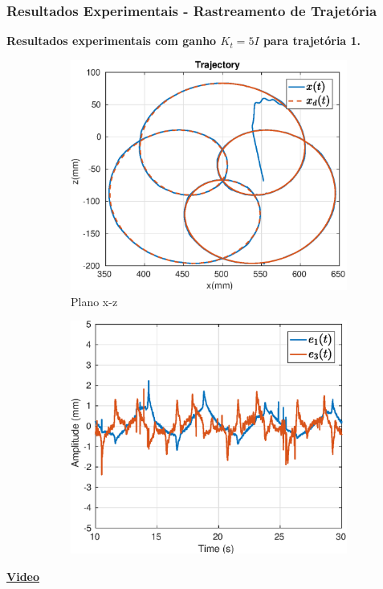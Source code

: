 \documentclass{beamer}
\begin{document}
\begin{frame}
\frametitle{Resultados Experimentais - Rastreamento de Trajetória}
\textbf{Resultados experimentais com ganho $K_t = 5 I$ para trajetória 1.}
\begin{figure}[H]
\centering
\begin{subfigure}{.5\textwidth}
  \centering
  \includegraphics[width=\linewidth]{./img/traj_1_k5/traj.eps}
  \caption{Plano x-z}
\end{subfigure}%
\begin{subfigure}{.5\textwidth}
  \centering
  \includegraphics[width=\linewidth]{./img/traj_1_k5/error.eps}
\end{subfigure}
\end{figure}%
\begin{center}
\href{run:traject1.mp4}{\textbf{Video}}%
\end{center}
\end{frame}
\end{document}
